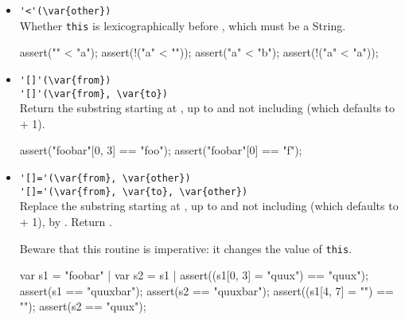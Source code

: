 \begin{itemize}
\item \lstinline|'<'(\var{other})|\\
  Whether \lstinline|this| is lexicographically before ,
  which must be a String.
\begin{urbiscript}[firstnumber=last]
assert("" < "a");
assert(!("a" < ""));
assert("a" < "b");
assert(!("a" < "a"));
\end{urbiscript}

\item \lstinline|'[]'(\var{from})|\\
  \lstinline|'[]'(\var{from}, \var{to})|\\
  Return the substring starting at , up to and not including
   (which defaults to  + 1).
\begin{urbiscript}[firstnumber=last]
assert("foobar"[0, 3] == "foo");
assert("foobar"[0] == "f");
\end{urbiscript}

\item \lstinline|'[]='(\var{from}, \var{other})|\\
  \lstinline|'[]='(\var{from}, \var{to}, \var{other})|\\
  Replace the substring starting at , up to and not including
   (which defaults to  + 1), by .  Return
  .

  Beware that this routine is imperative: it changes the value of
  \lstinline|this|.
\begin{urbiscript}[firstnumber=last]
var s1 = "foobar" | var s2 = s1 |
assert((s1[0, 3] = "quux") == "quux");
assert(s1 == "quuxbar");
assert(s2 == "quuxbar");
assert((s1[4, 7] = "") == "");
assert(s2 == "quux");
\end{urbiscript}
\end{itemize}

